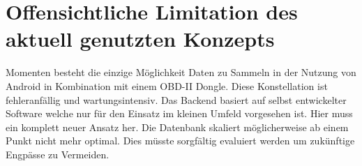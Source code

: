\documentclass[12pt,a4paper,bibliography=totocnumbered,listof=totocnumbered]{scrartcl}
\begin{document}
\section{Offensichtliche Limitation des aktuell genutzten Konzepts}

Momenten besteht die einzige Möglichkeit Daten zu Sammeln in der Nutzung von Android in Kombination mit einem OBD-II Dongle. Diese Konstellation ist fehleranfällig und wartungsintensiv.
Das Backend basiert auf selbst entwickelter Software welche nur für den Einsatz im kleinen Umfeld vorgesehen ist. Hier muss ein komplett neuer Ansatz her.
Die Datenbank skaliert möglicherweise ab einem Punkt nicht mehr optimal. Dies müsste sorgfältig evaluiert werden um zukünftige Engpässe zu Vermeiden.

\pagebreak


\nocite{*}
\renewcommand{\sectionmark}[1]{\markright{#1}}
\renewcommand{\subsectionmark}[1]{}
\renewcommand{\subsubsectionmark}[1]{}
\rhead{\rightmark}

\onehalfspacing
\renewcommand{\thesection}{\arabic{section}}
\renewcommand{\theHsection}{\arabic{section}}
\setcounter{section}{0}
\setcounter{page}{1}

\end{document}
